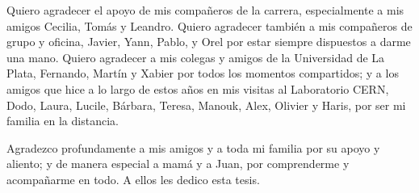 \documentclass[11pt,a4paper,12pt]{report}
\begin{document}
Quiero agradecer el apoyo de mis compa\~neros de la carrera, especialmente a mis amigos Cecilia, Tom\'as y Leandro. Quiero agradecer tambi\'en a mis  compa\~neros de grupo y oficina, Javier, Yann, Pablo, y Orel por estar siempre dispuestos a darme una mano.  Quiero agradecer a mis colegas y amigos de la Universidad de La Plata, Fernando, Mart\'in y Xabier por todos los momentos compartidos; y a los amigos que hice a lo largo de estos a\~nos en mis visitas al Laboratorio CERN, Dodo, Laura, Lucile, B\'arbara, Teresa, Manouk, Alex, Olivier y Haris, por ser mi familia en la distancia. %

Agradezco profundamente a mis amigos y a toda mi familia por su apoyo y aliento; y de manera especial a mam\'a y a Juan, por comprenderme y acompa\~narme en todo. A ellos les dedico esta tesis. %




\end{document}
